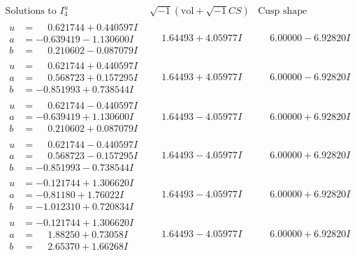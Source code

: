 \documentclass[1p]{elsarticle_modified}
\theoremstyle{definition}
\newcommand{\I}{\sqrt{-1}}
\begin{document}
$$\begin{array}{c|c|c}  
\text{Solutions to }I^u_{4}& \I (\text{vol} + \sqrt{-1}CS) & \text{Cusp shape}\\
 \hline 
\begin{aligned}
u &= \phantom{-}0.621744 + 0.440597 I \\
a &= -0.639419 - 1.130600 I \\
b &= \phantom{-}0.210602 - 0.087079 I\end{aligned}
 & \phantom{-}1.64493 + 4.05977 I & \phantom{-}6.00000 - 6.92820 I \\ \hline\begin{aligned}
u &= \phantom{-}0.621744 + 0.440597 I \\
a &= \phantom{-}0.568723 + 0.157295 I \\
b &= -0.851993 + 0.738544 I\end{aligned}
 & \phantom{-}1.64493 + 4.05977 I & \phantom{-}6.00000 - 6.92820 I \\ \hline\begin{aligned}
u &= \phantom{-}0.621744 - 0.440597 I \\
a &= -0.639419 + 1.130600 I \\
b &= \phantom{-}0.210602 + 0.087079 I\end{aligned}
 & \phantom{-}1.64493 - 4.05977 I & \phantom{-}6.00000 + 6.92820 I \\ \hline\begin{aligned}
u &= \phantom{-}0.621744 - 0.440597 I \\
a &= \phantom{-}0.568723 - 0.157295 I \\
b &= -0.851993 - 0.738544 I\end{aligned}
 & \phantom{-}1.64493 - 4.05977 I & \phantom{-}6.00000 + 6.92820 I \\ \hline\begin{aligned}
u &= -0.121744 + 1.306620 I \\
a &= -0.81180 + 1.76022 I \\
b &= -1.012310 + 0.720834 I\end{aligned}
 & \phantom{-}1.64493 - 4.05977 I & \phantom{-}6.00000 + 6.92820 I \\ \hline\begin{aligned}
u &= -0.121744 + 1.306620 I \\
a &= \phantom{-}1.88250 + 0.73058 I \\
b &= \phantom{-}2.65370 + 1.66268 I\end{aligned}
 & \phantom{-}1.64493 - 4.05977 I & \phantom{-}6.00000 + 6.92820 I \\ \hline\begin{aligned}

\end{aligned}
\end{array}$$
\end{document}

